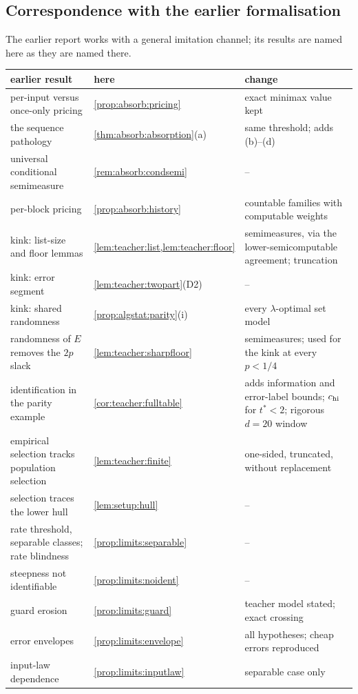 \subsection{Correspondence with the earlier formalisation}\label{app:related:t5}

The earlier report \citep[section ``Simplicity and normativity from imitation'']{claude2026whatfollows} works with a general imitation channel; its results are named here as they are named there.

\begin{center}\small
\begin{tabularx}{\linewidth}{@{}>{\raggedright\arraybackslash}X>{\raggedright\arraybackslash}p{3.6cm}>{\raggedright\arraybackslash}X@{}}
\toprule
earlier result & here & change\\
\midrule
per-input versus once-only pricing & \cref{prop:absorb:pricing} & exact minimax value kept\\
the sequence pathology & \cref{thm:absorb:absorption}(a) & same threshold; adds (b)--(d)\\
universal conditional semimeasure & \cref{rem:absorb:condsemi} & --\\
per-block pricing & \cref{prop:absorb:history} & countable families with computable weights\\
kink: list-size and floor lemmas & \cref{lem:teacher:list,lem:teacher:floor} & semimeasures, via the lower-semicomputable agreement; truncation\\
kink: error segment & \cref{lem:teacher:twopart}(D2) & --\\
kink: shared randomness & \cref{prop:algstat:parity}(i) & every $\lambda$-optimal set model\\
randomness of $E$ removes the $2p$ slack & \cref{lem:teacher:sharpfloor} & semimeasures; used for the kink at every $p<1/4$\\
identification in the parity example & \cref{cor:teacher:fulltable} & adds information and error-label bounds; $c_{\rm hi}$ for $t^*<2$; rigorous $d=20$ window\\
empirical selection tracks population selection & \cref{lem:teacher:finite} & one-sided, truncated, without replacement\\
selection traces the lower hull & \cref{lem:setup:hull} & --\\
rate threshold, separable classes; rate blindness & \cref{prop:limits:separable} & --\\
steepness not identifiable & \cref{prop:limits:noident} & --\\
guard erosion & \cref{prop:limits:guard} & teacher model stated; exact crossing\\
error envelopes & \cref{prop:limits:envelope} & all hypotheses; cheap errors reproduced\\
input-law dependence & \cref{prop:limits:inputlaw} & separable case only\\
\bottomrule
\end{tabularx}
\end{center}


